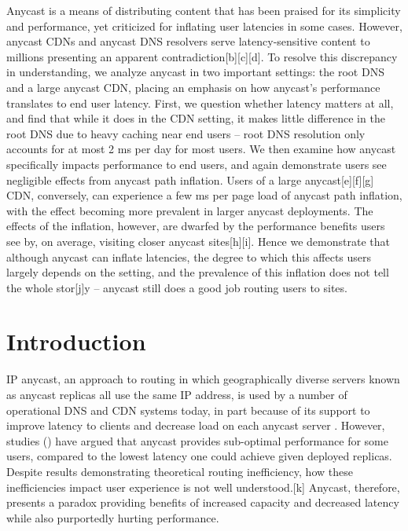 \documentclass[sigconf,letterpaper,nonacm,10pt]{acmart}
\begin{document}
Anycast is a means of distributing content that has been praised for its
simplicity and performance, yet criticized for inflating user latencies
in some cases. However, anycast CDNs and anycast DNS resolvers serve
latency-sensitive content to millions presenting an apparent
contradiction{[}b{]}{[}c{]}{[}d{]}. To resolve this discrepancy in
understanding, we analyze anycast in two important settings: the root
DNS and a large anycast CDN, placing an emphasis on how anycast's
performance translates to end user latency. First, we question whether
latency matters at all, and find that while it does in the CDN setting,
it makes little difference in the root DNS due to heavy caching near end
users -- root DNS resolution only accounts for at most 2 ms per day for
most users. We then examine how anycast specifically impacts performance
to end users, and again demonstrate users see negligible effects from
anycast path inflation. Users of a large anycast{[}e{]}{[}f{]}{[}g{]}
CDN, conversely, can experience a few ms per page load of anycast path
inflation, with the effect becoming more prevalent in larger anycast
deployments. The effects of the inflation, however, are dwarfed by the
performance benefits users see by, on average, visiting closer anycast
sites{[}h{]}{[}i{]}. Hence we demonstrate that although anycast can
inflate latencies, the degree to which this affects users largely
depends on the setting, and the prevalence of this inflation does not
tell the whole stor{[}j{]}y -- anycast still does a good job routing
users to sites.

\hypertarget{introduction-1}{%
\section{Introduction}\label{introduction-1}}

\label{sec:introduction} IP anycast, an approach to routing in which
geographically diverse servers known as anycast replicas all use the
same IP address, is used by a number of operational DNS
\cite{root_servers, cloudflare_anycast, akamai_anycast, route53_anycast, google_public_dns}
and CDN \cite{calder2015analyzing,edgecast_anycast,amazon_cloudfront}
systems today, in part because of its support to improve latency to
clients and decrease load on each anycast server
\cite{katabi2000framework,metz2002ip,rfc_1546}. However, studies
(\cite{sarat2006use, li_levin_spring_bhattacharjee_2018}) have argued
that anycast provides sub-optimal performance for some users, compared
to the lowest latency one could achieve given deployed replicas. Despite
results demonstrating theoretical routing inefficiency, how these
inefficiencies impact user experience is not well understood.{[}k{]}
Anycast, therefore, presents a paradox providing benefits of increased
capacity and decreased latency while also purportedly hurting
performance.
\end{document}
